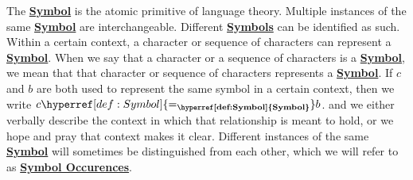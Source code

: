 \newcommand{\Symbol}[0]{\textbf{\hyperref[def:Symbol]{Symbol}}\xspace}
\newcommand{\Symbols}[0]{\textbf{\hyperref[def:Symbol]{Symbols}}\xspace}
\newcommand{\SymbolEqual}[0]{\hyperref[def:Symbol]{\ensuremath{=_{\Symbol}}}\xspace}
\newcommand{\SymbolOccurence}[0]{\textbf{\hyperref[def:Symbol]{Symbol Occurence}}\xspace}
\newcommand{\SymbolOccurences}[0]{\textbf{\hyperref[def:Symbol]{Symbol Occurences}}\xspace}
\begin{df}[\Symbol]
\label{def:Symbol}

\rm
    The \Symbol is the atomic primitive of language theory. 
    Multiple instances of the same \Symbol are interchangeable. 
    Different \Symbols can be identified as such. 
    Within a certain context, 
    a character or sequence of characters 
    can represent a \Symbol.
    When we say that a character or a sequence 
    of characters is a \Symbol, 
    we mean that that character or sequence 
    of characters represents a \Symbol. 
    If $c$ and $b$ are both used to represent 
    the same symbol in a certain context, 
    then we write $c \SymbolEqual b$.
    and we either verbally describe the context in which that relationship
    is meant to hold, or we hope and pray that context makes it clear.
    Different instances of the same \Symbol 
    will sometimes be distinguished from each other, 
    which we will refer to as \SymbolOccurences.
\end{df}
